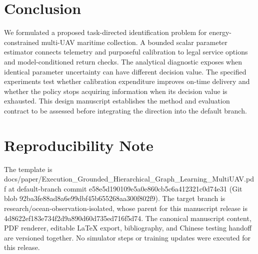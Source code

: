 \documentclass[10pt,twocolumn,letterpaper]{article}
\begin{document}
\section{Conclusion}
We formulated a proposed task-directed identification problem for energy-constrained multi-UAV maritime collection. A bounded scalar parameter estimator connects telemetry and purposeful calibration to legal service options and model-conditioned return checks. The analytical diagnostic exposes when identical parameter uncertainty can have different decision value. The specified experiments test whether calibration expenditure improves on-time delivery and whether the policy stops acquiring information when its decision value is exhausted. This design manuscript establishes the method and evaluation contract to be assessed before integrating the direction into the default branch.

\section*{Reproducibility Note}
The template is docs/paper/Execution\_Grounded\_Hierarchical\_Graph\_Learning\_MultiUAV.pdf at default-branch commit e58e5d190109e5a0e860cb5c6a412321c0d74e31 (Git blob 92ba3fe88ad8a6e99dbf45b655268aa300f802f9). The target branch is research/ocean-observation-isolated, whose parent for this manuscript release is 4d8622ef183e734f2d9a890d60d735ed716f5d74. The canonical manuscript content, PDF renderer, editable LaTeX export, bibliography, and Chinese testing handoff are versioned together. No simulator steps or training updates were executed for this release.



\end{document}
